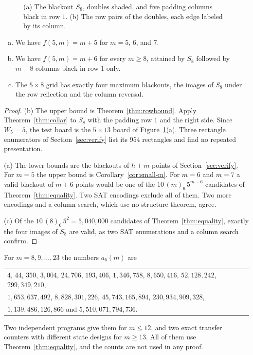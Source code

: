 \begin{figure}[t]
\centering

\caption{(a) The blackout $S_8$, doubles shaded, and five padding columns black in row $1$.
(b) The row pairs of the doubles, each edge labeled by its column.}
\label{fig:fiveeight}
\end{figure}

\begin{theorem}\label{thm:fiverow}
\begin{enumerate}[(a)]
\item We have $f(5,m)=m+5$ for $m=5$, $6$, and $7$.
\item We have $f(5,m)=m+6$ for every $m\ge8$, attained by $S_8$ followed by $m-8$ columns black in
row $1$ only.
\item The $5\times8$ grid has exactly four maximum blackouts, the images of $S_8$ under the row
reflection and the column reversal.
\end{enumerate}
\end{theorem}

\begin{proof}
(b) The upper bound is Theorem~\ref{thm:rowbound}. Apply Theorem~\ref{thm:collar} to $S_8$
with the padding row $1$ and the right side. Since $W_5=5$, the test board is the $5\times13$
board of Figure~\ref{fig:fiveeight}(a). Three rectangle enumerators of
Section~\ref{sec:verify} list its $954$ rectangles and find no repeated presentation.

(a) The lower bounds are the blackouts of $h+m$ points of Section~\ref{sec:verify}. For $m=5$
the upper bound is Corollary~\ref{cor:small-m}. For $m=6$ and $m=7$ a valid blackout of $m+6$
points would be one of the $10\,(m)_6\,5^{m-6}$ candidates of Theorem~\ref{thm:equality}. Two
SAT encodings exclude all of them. Two more encodings and a column search, which use no
structure theorem, agree.

(c) Of the $10\,(8)_6\,5^2=5{,}040{,}000$ candidates of Theorem~\ref{thm:equality}, exactly
the four images of $S_8$ are valid, as two SAT enumerations and a column search confirm.
\end{proof}

\begin{remark}\label{rem:fivecounts}
For $m=8,9,\dots,23$ the numbers $a_5(m)$ are
\begin{center}\small
\begin{tabular}{@{}l@{}}
$4$, $44$, $350$, $3{,}004$, $24{,}706$, $193{,}406$, $1{,}346{,}758$, $8{,}650{,}416$,
$52{,}128{,}242$, $299{,}349{,}210$,\\
$1{,}653{,}637{,}492$, $8{,}828{,}301{,}226$, $45{,}743{,}165{,}894$, $230{,}934{,}909{,}328$,\\
$1{,}139{,}486{,}126{,}866$ and $5{,}510{,}071{,}794{,}736$.
\end{tabular}
\end{center}
Two independent programs give them
for $m\le12$, and two exact transfer counters with different state designs for $m\ge13$. All of
them use Theorem~\ref{thm:equality}, and the counts are not used in any proof.
\end{remark}

